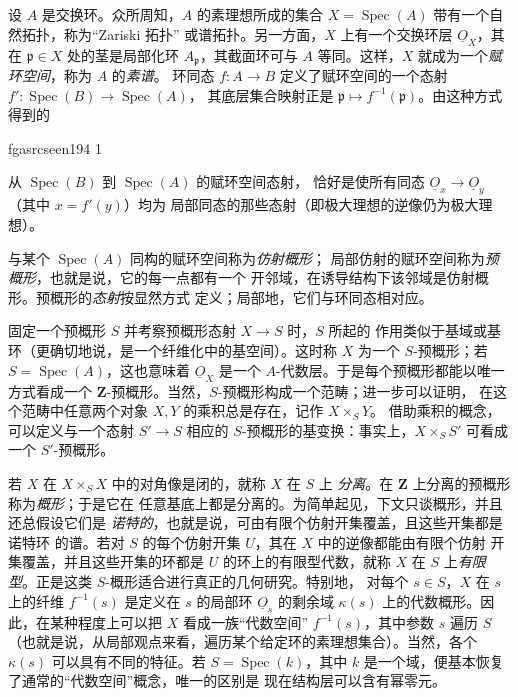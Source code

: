 \documentclass[12pt,twoside,openany]{book}
\numberwithin{equation}{section}
\newcommand{\fgaunitid}{unbound}
\newcommand{\src}[1]{%
  \phantomsection
  \hypertarget{src:\fgaunitid:#1}{}%
  \hypertarget{fga.\fgaunitid.p#1}{}%
  \ifcsname fgasrcseen#1\endcsname\else
    \expandafter\gdef\csname fgasrcseen#1\endcsname{1}%
    \hypertarget{src:#1}{}%
  \fi
  \marginpar{\raggedleft\footnotesize\sffamily #1}%
}
\newcommand{\Osh}{\underline{O}}
\newcommand{\fquote}[1]{“#1”}
\theoremstyle{plain}
\theoremstyle{definition}
\theoremstyle{remark}
\begin{document}
设 $A$ 是交换环。众所周知，$A$ 的素理想所成的集合
$X=\operatorname{Spec}(A)$ 带有一个自然拓扑，称为\fquote{Zariski 拓扑}
或谱拓扑。另一方面，$X$ 上有一个交换环层 $\Osh_X$，其在
$\mathfrak p\in X$ 处的茎是局部化环 $A_{\mathfrak p}$，其截面环可与 $A$
等同。这样，$X$ 就成为一个\emph{赋环空间}，称为 $A$ 的\emph{素谱}。
环同态 $f:A\longrightarrow B$ 定义了赋环空间的一个态射
$f':\operatorname{Spec}(B)\longrightarrow\operatorname{Spec}(A)$，
其底层集合映射正是
$\mathfrak p\longmapsto f^{-1}(\mathfrak p)$。由这种方式得到的

\src{194}
从 $\operatorname{Spec}(B)$ 到 $\operatorname{Spec}(A)$ 的赋环空间态射，
恰好是使所有同态 $\Osh_x\longrightarrow\Osh_y$（其中 $x=f'(y)$）均为
局部同态的那些态射（即极大理想的逆像仍为极大理想）。

与某个 $\operatorname{Spec}(A)$ 同构的赋环空间称为\emph{仿射概形}；
局部仿射的赋环空间称为\emph{预概形}，也就是说，它的每一点都有一个
开邻域，在诱导结构下该邻域是仿射概形。预概形的\emph{态射}按显然方式
定义；局部地，它们与环同态相对应。

固定一个预概形 $S$ 并考察预概形态射 $X\longrightarrow S$ 时，$S$ 所起的
作用类似于基域或基环（更确切地说，是一个纤维化中的基空间）。这时称
$X$ 为一个 $S$-预概形；若 $S=\operatorname{Spec}(A)$，这也意味着
$\Osh_X$ 是一个 $A$-代数层。于是每个预概形都能以唯一方式看成一个
$\mathbf Z$-预概形。当然，$S$-预概形构成一个范畴；进一步可以证明，
在这个范畴中任意两个对象 $X,Y$ 的乘积总是存在，记作 $X\times_S Y$。
借助乘积的概念，可以定义与一个态射 $S'\longrightarrow S$ 相应的
$S$-预概形的基变换：事实上，$X\times_S S'$ 可看成一个 $S'$-预概形。

若 $X$ 在 $X\times_S X$ 中的对角像是闭的，就称 $X$ 在 $S$ 上
\emph{分离}。在 $\mathbf Z$ 上分离的预概形称为\emph{概形}；于是它在
任意基底上都是分离的。为简单起见，下文只谈概形，并且还总假设它们是
\emph{诺特的}，也就是说，可由有限个仿射开集覆盖，且这些开集都是诺特环
的谱。若对 $S$ 的每个仿射开集 $U$，其在 $X$ 中的逆像都能由有限个仿射
开集覆盖，并且这些开集的环都是 $U$ 的环上的有限型代数，就称 $X$ 在
$S$ 上\emph{有限型}。正是这类 $S$-概形适合进行真正的几何研究。特别地，
对每个 $s\in S$，$X$ 在 $s$ 上的纤维 $f^{-1}(s)$ 是定义在 $s$ 的局部环
$\Osh_s$ 的剩余域 $\kappa(s)$ 上的代数概形。因此，在某种程度上可以把
$X$ 看成一族\fquote{代数空间} $f^{-1}(s)$，其中参数 $s$ 遍历 $S$
（也就是说，从局部观点来看，遍历某个给定环的素理想集合）。当然，各个
$\kappa(s)$ 可以具有不同的特征。若 $S=\operatorname{Spec}(k)$，其中
$k$ 是一个域，便基本恢复了通常的\fquote{代数空间}概念，唯一的区别是
现在结构层可以含有幂零元。
\end{document}
